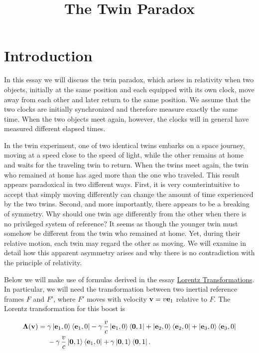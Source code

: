 \documentclass[12pt]{article}
\title{The Twin Paradox}
\author{}
\date{}
\begin{document}
\maketitle
\section{Introduction}

In this essay we will discuss the twin paradox, which arises in relativity when two objects,
initially at the same position and each equipped with its own clock, move away from each other
and later return to the same position. We assume that the two clocks are initially synchronized
and therefore measure exactly the same time. When the two objects meet again, however, the clocks
will in general have measured different elapsed times. \par

In the twin experiment, one of two identical twins embarks on a space journey, moving at a speed
close to the speed of light, while the other remains at home and waits for the traveling twin to
return. When the twins meet again, the twin who remained at home has aged more than the one who
traveled. This result appears paradoxical in two different ways. First, it is very counterintuitive
to accept that simply moving differently can change the amount of time experienced by the two twins.
Second, and more importantly, there appears to be a breaking of symmetry. Why should one twin age
differently from the other when there is no privileged system of reference? It seems as though the
younger twin must somehow be different from the twin who remained at home. Yet, during their relative
motion, each twin may regard the other as moving. We will examine in detail how this apparent
asymmetry arises and why there is no contradiction with the principle of relativity. \par

Below we will make use of formulas derived in the essay
\href{/physics/relativity/special-relativity/lorentz-transformations}{Lorentz Transformations}.
In particular, we will need the transformation between two inertial reference frames $F$ and $F'$,
where $F'$ moves with velocity $\vb{v}=v\vb{e}_1$ relative to $F$. The Lorentz transformation
for this boost is

\begin{equation}
  \begin{aligned}
    \boldsymbol{\Lambda}(\vb{v}) =\;
      &\gamma\ket{\vb{e}_1,0}\bra{\vb{e}_1,0}
      - \gamma\,\frac{v}{c}
        \ket{\vb{e}_1,0}\bra{\vb{0},1}
      + \ket{\vb{e}_2,0}\bra{\vb{e}_2,0}
      + \ket{\vb{e}_3,0}\bra{\vb{e}_3,0}
      \\
      &- \gamma\,\frac{v}{c}
        \ket{\vb{0},1}\bra{\vb{e}_1,0}
      + \gamma\ket{\vb{0},1}\bra{\vb{0},1}.
  \end{aligned}
  \label{eq:Lorentz_transformation}
\end{equation}
\end{document}

